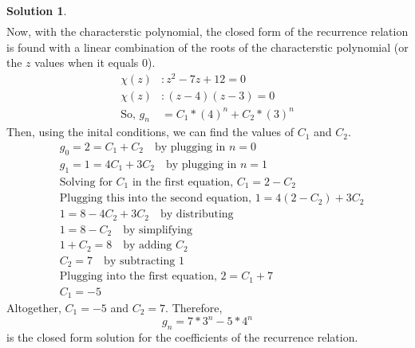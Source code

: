 \documentclass{article}
\theoremstyle{definition}
\newtheorem*{solution}{Solution}
\begin{document}
\begin{solution}
\begin{align*}
\end{align*}
Now, with the characterstic polynomial, the closed form of the recurrence relation is found with a linear combination of the roots of the characterstic polynomial (or the $z$ values when it equals 0).
\begin{align*}
\chi (z) &: z^2 - 7z + 12 = 0\\
\chi (z) &: (z-4)(z-3) = 0\\
\mbox{So, } g_n &= C_1*(4)^n + C_2*(3)^n
\end{align*}
Then, using the inital conditions, we can find the values of $C_1$ and $C_2$.
\begin{align*}
&g_0 = 2 = C_1 + C_2 \quad \mbox{by plugging in $n=0$}\\
&g_1 = 1 = 4C_1 + 3C_2 \quad \mbox{by plugging in $n=1$}\\
&\mbox{Solving for $C_1$ in the first equation, } C_1 = 2-C_2\\
&\mbox{Plugging this into the second equation, } 1= 4(2-C_2) + 3C_2\\
&1= 8-4C_2 + 3C_2 \quad \mbox{by distributing}\\
&1= 8-C_2 \quad \mbox{by simplifying}\\
&1+C_2 = 8\quad \mbox{by adding $C_2$}\\
&C_2 = 7 \quad \mbox{by subtracting 1}\\
&\mbox{Plugging into the first equation, } 2 = C_1 + 7\\
& C_1 = -5
\end{align*}
Altogether, $C_1 = -5$ and $C_2 = 7$. Therefore, 
$$ g_n = 7*3^n - 5*4^n $$
is the closed form solution for the coefficients of the recurrence relation.
\end{solution}
\end{document}
